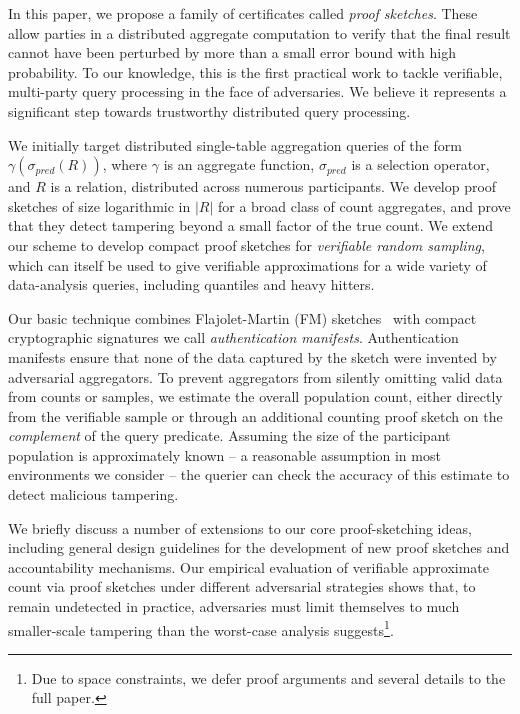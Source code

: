 \documentclass[10pt,twocolumn]{article}
\newcommand{\proofsketches}{proof sketches\xspace}
\newcommand{\ams}{authentication manifests\xspace}
\newcommand{\Ams}{Authentication manifests\xspace}
\newcommand{\pred}{\ensuremath{\mathit{pred}}\xspace}
\newcommand\vpar{{\vspace*{0.3em}}}
\newcommand{\stitle}[1]{\vpar\noindent{\bf #1\/}}
\begin{document}

\stitle{Our Contributions.}
In this paper, we propose a family of certificates called
\emph{\proofsketches\/}. These allow parties in a distributed aggregate
computation to verify that the final result cannot have been
perturbed by more than a small error bound with high probability.  To our knowledge, this is the first
practical work to tackle verifiable, multi-party query
processing in the face of adversaries.  We believe it represents a significant step
towards trustworthy distributed query processing.

We initially target distributed single-table aggregation queries of the form
$\gamma(\sigma_{\pred}(R))$, where $\gamma$ is an aggregate function,
$\sigma_{\pred}$ is a selection operator, and $R$ is a relation,
distributed across numerous participants.
We develop \proofsketches of size logarithmic in $|R|$ for a broad class of
count 
aggregates, and prove that they detect tampering beyond a small
factor of the true count.  We extend our scheme to develop compact
\proofsketches for {\em verifiable random sampling},
which can itself be used to give verifiable approximations for
a wide variety of data-analysis queries, including
quantiles and heavy hitters.

Our basic technique combines
Flajolet-Martin (FM) sketches~\cite{Flajolet1985} with compact cryptographic
signatures we call \emph{\ams\/}.  \Ams ensure that none of the data
captured by the sketch were invented by adversarial aggregators.  To
prevent aggregators from silently omitting valid data from counts or
samples, 
we estimate the overall population count, either
directly from the verifiable sample or through an additional counting 
proof sketch on the {\em complement\/} of the query predicate.
Assuming the size of the participant population is approximately known
-- a reasonable assumption in most environments we
consider -- the querier can check the accuracy of this estimate to
detect malicious 
tampering.  

We briefly discuss a number of extensions to our core proof-sketching ideas,
including general design guidelines for the development of new 
\proofsketches and accountability mechanisms.
Our empirical evaluation of verifiable approximate count via \proofsketches under
different adversarial strategies shows that, to remain undetected in practice,
adversaries must limit themselves to much smaller-scale tampering than
the worst-case analysis suggests\footnote{Due to space constraints, 
we defer proof arguments and several details to the full paper.}.
\end{document}
